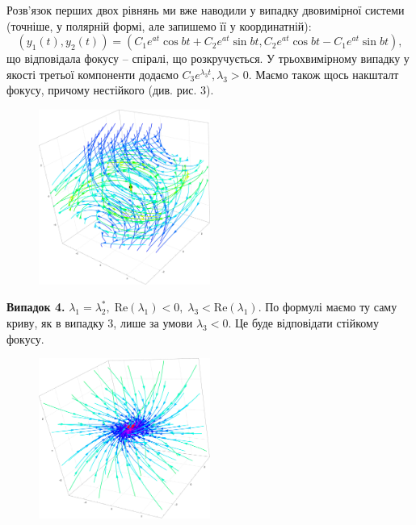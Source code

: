 \documentclass[oneside,solution]{tmpl}
\begin{document}
Розв'язок перших двох рівнянь ми вже наводили у випадку двовимірної системи (точніше, у полярній формі, але запишемо її у координатній):
\begin{equation}
    (y_1(t),y_2(t)) = (C_1e^{at}\cos bt + C_2e^{at}\sin bt, C_2e^{at}\cos bt - C_1e^{at}\sin bt),
\end{equation}
що відповідала фокусу -- спіралі, що розкручується. У трьохвимірному випадку у якості третьої компоненти додаємо $C_3e^{\lambda_3t}, \lambda_3 > 0$. Маємо також щось накшталт фокусу, причому нестійкого (див. рис. 3).
\begin{figure}[H]
    \centering
    \includegraphics[width=0.5\textwidth]{images/hw_8/case_3.pdf}
\end{figure}

\textbf{Випадок 4.} $\lambda_1 = \lambda_2^*, \; \text{Re}(\lambda_1)<0, \; \lambda_3<\text{Re}(\lambda_1)$. По формулі маємо ту саму криву, як в випадку 3, лише за умови $\lambda_3 < 0$. Це буде відповідати стійкому фокусу.
\begin{figure}[H]
    \centering
    \includegraphics[width=0.5\textwidth]{images/hw_8/case_4.pdf}
\end{figure}
\end{document}
